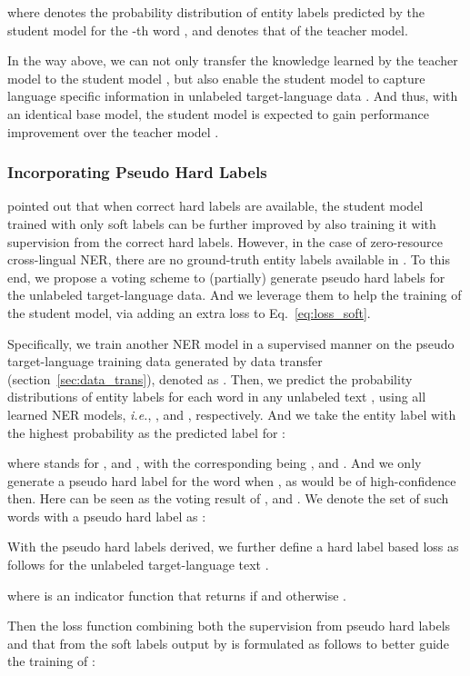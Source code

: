 \documentclass{article}
\newcommand\ie{\textit{i.e.}}
\begin{document}
where  denotes the probability distribution of entity labels predicted by the student model for the -th word , and  denotes that of the teacher model. 

In the way above, we can not only transfer the knowledge learned by the teacher model  to the student model , but also enable the student model  to capture language specific information in unlabeled target-language data . And thus, with an identical base model, the student model  is expected to gain performance improvement over the teacher model .

\subsubsection{Incorporating Pseudo Hard Labels}
\cite{hinton2015distilling} pointed out that when correct hard labels are available, the student model trained with only soft labels can be further improved by also training it with supervision from the correct hard labels. 
However, in the case of zero-resource cross-lingual NER, there are no ground-truth entity labels available in . 
To this end, we propose a voting scheme to (partially) generate pseudo hard labels for the unlabeled target-language data. And we leverage them to help the training of the student model, via adding an extra loss to Eq.~\ref{eq:loss_soft}.

Specifically, we train another NER model in a supervised manner on the pseudo target-language training data generated by data transfer (section~\ref{sec:data_trans}), denoted as . Then, we predict the probability distributions of entity labels for each word  in any unlabeled text , using all learned NER models, \ie{}, ,  and , respectively. 
And we take the entity label  with the highest probability as the predicted label  for :

where  stands for ,  and , with the corresponding  being ,  and .
And we only generate a pseudo hard label  for the word  when , as  would be of high-confidence then. Here  can be seen as the voting result of ,  and .
We denote the set of such words with a pseudo hard label as :


With the pseudo hard labels derived, we further define a hard label based loss  as follows for the unlabeled target-language text .

where  is an indicator function that returns  if  and otherwise . 

Then the loss function combining both the supervision from pseudo hard labels and that from the soft labels output by  is formulated as follows to better guide the training of :
\end{document}
